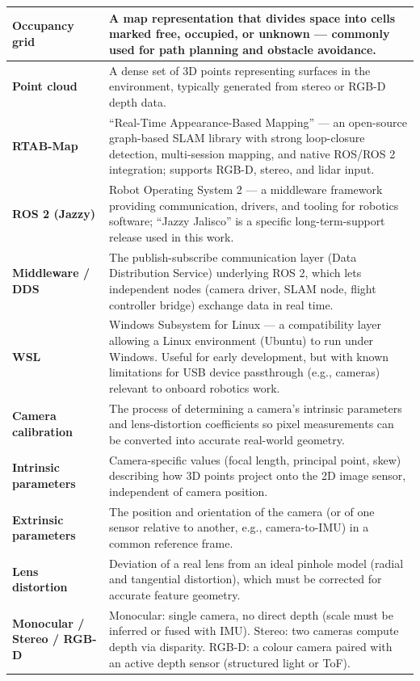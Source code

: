 \documentclass[11pt,a4paper]{article}
\begin{document}
\begin{longtable}{@{}p{4.5cm}p{10.5cm}@{}}
    \midrule
    \textbf{Occupancy grid} & A map representation that divides space into cells marked free, occupied, or unknown --- commonly used for path planning and obstacle avoidance. \\
    \midrule
    \textbf{Point cloud} & A dense set of 3D points representing surfaces in the environment, typically generated from stereo or RGB-D depth data. \\
    \midrule
    \textbf{RTAB-Map} & ``Real-Time Appearance-Based Mapping'' --- an open-source graph-based SLAM library with strong loop-closure detection, multi-session mapping, and native ROS/ROS 2 integration; supports RGB-D, stereo, and lidar input. \\
    \midrule
    \textbf{ROS 2 (Jazzy)} & Robot Operating System 2 --- a middleware framework providing communication, drivers, and tooling for robotics software; ``Jazzy Jalisco'' is a specific long-term-support release used in this work. \\
    \midrule
    \textbf{Middleware / DDS} & The publish-subscribe communication layer (Data Distribution Service) underlying ROS 2, which lets independent nodes (camera driver, SLAM node, flight controller bridge) exchange data in real time. \\
    \midrule
    \textbf{WSL} & Windows Subsystem for Linux --- a compatibility layer allowing a Linux environment (Ubuntu) to run under Windows. Useful for early development, but with known limitations for USB device passthrough (e.g., cameras) relevant to onboard robotics work. \\
    \midrule
    \textbf{Camera calibration} & The process of determining a camera's intrinsic parameters and lens-distortion coefficients so pixel measurements can be converted into accurate real-world geometry. \\
    \midrule
    \textbf{Intrinsic parameters} & Camera-specific values (focal length, principal point, skew) describing how 3D points project onto the 2D image sensor, independent of camera position. \\
    \midrule
    \textbf{Extrinsic parameters} & The position and orientation of the camera (or of one sensor relative to another, e.g., camera-to-IMU) in a common reference frame. \\
    \midrule
    \textbf{Lens distortion} & Deviation of a real lens from an ideal pinhole model (radial and tangential distortion), which must be corrected for accurate feature geometry. \\
    \midrule
    \textbf{Monocular / Stereo / RGB-D} & Monocular: single camera, no direct depth (scale must be inferred or fused with IMU). Stereo: two cameras compute depth via disparity. RGB-D: a colour camera paired with an active depth sensor (structured light or ToF). \\

\end{longtable}
\end{document}
